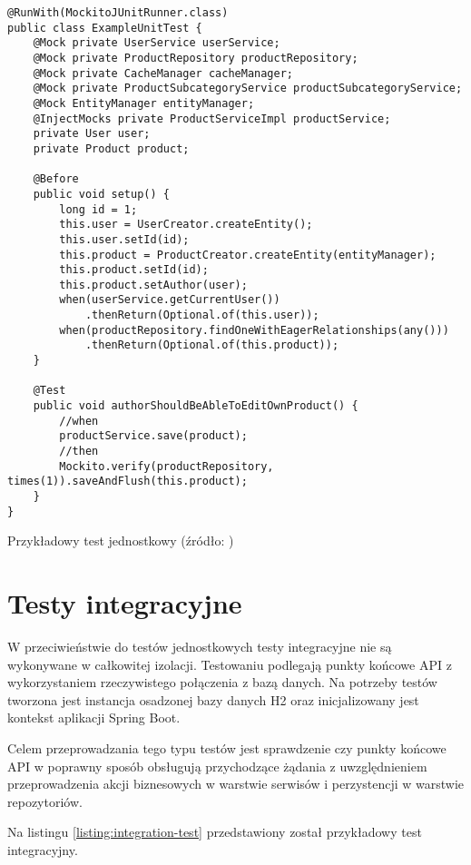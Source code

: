 \begin{listing}[h!]
\begin{verbatim}
@RunWith(MockitoJUnitRunner.class)
public class ExampleUnitTest {
    @Mock private UserService userService;
    @Mock private ProductRepository productRepository;
    @Mock private CacheManager cacheManager;
    @Mock private ProductSubcategoryService productSubcategoryService;
    @Mock EntityManager entityManager;
    @InjectMocks private ProductServiceImpl productService;
    private User user;
    private Product product;

    @Before
    public void setup() {
        long id = 1;
        this.user = UserCreator.createEntity();
        this.user.setId(id);
        this.product = ProductCreator.createEntity(entityManager);
        this.product.setId(id);
        this.product.setAuthor(user);
        when(userService.getCurrentUser())
            .thenReturn(Optional.of(this.user));
        when(productRepository.findOneWithEagerRelationships(any()))
            .thenReturn(Optional.of(this.product));
    }

    @Test
    public void authorShouldBeAbleToEditOwnProduct() {
        //when
        productService.save(product);
        //then
        Mockito.verify(productRepository, times(1)).saveAndFlush(this.product);
    }
}
\end{verbatim}
    \centering\caption{Przykładowy test jednostkowy (źródło: \ownwork)}\label{listing:unit-test}
\end{listing}

\section{Testy integracyjne}

W przeciwieństwie do testów jednostkowych testy integracyjne nie są wykonywane w całkowitej izolacji\cite{book:testy-jednostkowe}.
Testowaniu podlegają punkty końcowe API z wykorzystaniem rzeczywistego połączenia z bazą danych.
Na potrzeby testów tworzona jest instancja osadzonej bazy danych H2\cite{tech:h2-db} oraz inicjalizowany jest kontekst aplikacji Spring Boot.

\par
Celem przeprowadzania tego typu testów jest sprawdzenie czy punkty końcowe API w poprawny sposób obsługują przychodzące żądania
z uwzględnieniem przeprowadzenia akcji biznesowych w warstwie serwisów i perzystencji w warstwie repozytoriów.

\par
Na listingu \ref{listing:integration-test} przedstawiony został przykładowy test integracyjny.

